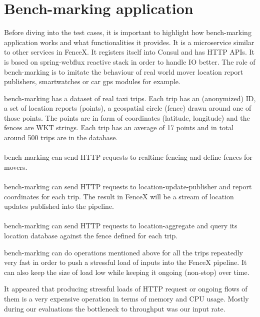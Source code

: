\documentclass[a4]{report}
\begin{document}
    \section{Bench-marking application}
    Before diving into the test cases, it is important to highlight how bench-marking application works and what
    functionalities it provides.
    It is a microservice similar to other services in FenceX.
    It registers itself into Consul and has HTTP APIs.
    It is based on spring-webflux\cite{webflux} reactive stack in order to handle IO better.
    The role of bench-marking is to imitate the behaviour of real world mover location report publishers,
    smartwatches or car gps modules for example.

    bench-marking has a dataset of real taxi trips.
    Each trip has an (anonymized) ID, a set of location reports (points), a geospatial circle (fence) drawn around one
    of those points.
    The points are in form of coordinates (latitude, longitude) and the fences are WKT strings.
    Each trip has an average of 17 points and in total around 500 trips are in the database.

    \paragraph{}
    bench-marking can send HTTP requests to realtime-fencing and define fences for movers.

    \paragraph{}
    bench-marking can send HTTP requests to location-update-publisher and report coordinates for each trip.
    The result in FenceX will be a stream of location updates published into the pipeline.

    \paragraph{}
    bench-marking can send HTTP requests to location-aggregate and query its location database against the fence
    defined for each trip.

    bench-marking can do operations mentioned above for all the trips repeatedly very fast in order to push a
    stressful load of inputs into the FenceX pipeline.
    It can also keep the size of load low while keeping it ongoing (non-stop) over time.

    It appeared that producing stressful loads of HTTP request or ongoing flows of them is a very expensive operation
    in terms of memory and CPU usage.
    Mostly during our evaluations the bottleneck to throughput was our input rate.
\end{document}
